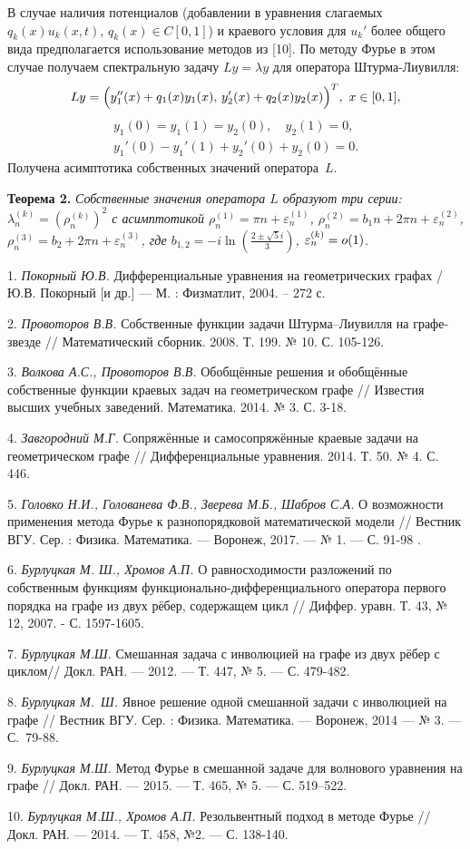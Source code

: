 В случае наличия потенциалов (добавлении в уравнения  слагаемых
$q_k(x)u_k(x,t)$, $q_k(x)\in C[0,1]$) и краевого условия для $u_k'$
более общего вида предполагается использование методов из [10]. По
методу Фурье в этом случае получаем спектральную задачу $Ly=\lambda
y$ для оператора Штурма-Лиувилля:
$$
    Ly=\Bigl(y_1''(x) + q_1(x) y_1(x), \,
    y_2'(x) +  q_2(x) y_2(x)\Bigl)^T,\   x\in [0,1], $$
    $$\begin{array}{c}
    y_1(0)=y_1(1)=y_2(0), \quad
    y_2(1)=0, \\
    y_1'(0) - y_1'(1) + y_2'(0) + y_2(0)=0.
    \end{array}
    $$
Получена асимптотика собственных значений   оператора~$L$.

    \textbf{Теорема 2.}
\textit{Собственные значения оператора $L$ образуют три серии:
$\lambda _n^{(k)}=(\rho_n^{(k)})^2$ с асимптотикой $\rho_n^{(1)}=\pi
n + \varepsilon_n^{(1)}$, $\rho_n^{(2)}=b_1 n + 2\pi n +
\varepsilon_n^{(2)}$, $\rho_n^{(3)}=b_2 + 2\pi n +
\varepsilon_n^{(3)}$,
    где $b _{1,2}=-i \ln(\frac{2\pm\sqrt{5}i}{3})$, $\varepsilon_n^{(k)}=\tiny{o}(1)$.} \\


\litlist

1.  {\it Покорный Ю.В.} Дифференциальные уравнения на геометрических
графах / Ю.В. Покорный [и др.] --- М. : Физматлит, 2004. -- 272 с.

2.  {\it Провоторов В.В.} Собственные функции задачи Штурма–Лиувилля на
графе-звезде // Математический сборник. 2008. Т. 199. № 10. С.
105-126.

3.  {\it Волкова А.С., Провоторов В.В.} Обобщённые решения и обобщённые
собственные функции краевых задач на геометрическом графе  //
Известия высших учебных заведений. Математика. 2014. № 3. С. 3-18.

4. {\it Завгородний М.Г.} Сопряжённые и самосопряжённые краевые задачи на
геометрическом графе   //
 Дифференциальные уравнения. 2014. Т. 50. № 4. С.
446.

5. {\it Головко Н.И., Голованева Ф.В., Зверева М.Б., Шабров С.А.} О
возможности применения метода Фурье к разнопорядковой математической
модели // Вестник ВГУ. Сер. :  Физика. Математика. --- Воронеж,
2017. --- № 1. --- С. 91-98 .

6.  {\it Бурлуцкая М. Ш., Хромов  А.П.}  О равносходимости разложений по
собственным функциям функционально-диф\-фе\-рен\-циаль\-ного
оператора первого порядка на  графе из двух рёбер,  содержащем  цикл
// Диффер. уравн. Т. 43, №  12,  2007. - С. 1597-1605.

7. {\it Бурлуцкая М.Ш.} Смешанная задача с инволюцией на графе  из двух
рёбер с циклом// Докл. РАН. --- 2012. --- Т. 447, № 5. --- С.
479-482.

8. {\it Бурлуцкая М.~Ш.}  Явное решение одной смешанной задачи с
 инволюцией на графе  // Вестник ВГУ.  Сер. : Физика. Математика. --- Воронеж, 2014 ---  № 3.
    --- С.~79-88.

9.  {\it Бурлуцкая М.Ш.} Метод Фурье в смешанной задаче для волнового
уравнения на графе   // Докл. РАН. --- 2015. --- Т. 465, № 5. --- С.
519–522.

10.  {\it Бурлуцкая М.Ш., Хромов А.П.} Резольвентный подход в методе Фурье
  // Докл. РАН. --– 2014. --- Т. 458, №2.
--- С. 138-140.

